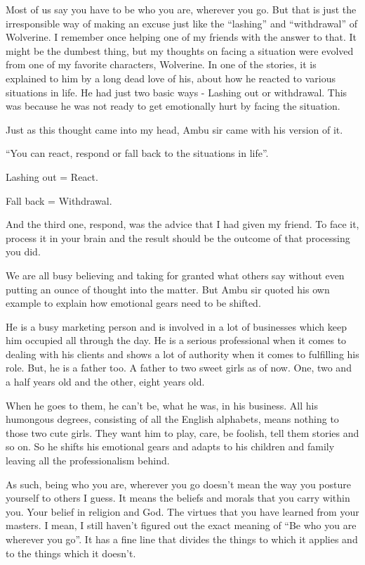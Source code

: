 \documentclass[twoside,11pt]{article}
\begin{document}
Most of us say you have to be who you are, wherever you go. But that is just the irresponsible way of making an excuse just like the ``lashing'' and ``withdrawal'' of Wolverine. I remember once helping one of my friends with the answer to that. It might be the dumbest thing, but my thoughts on facing a situation were evolved from one of my favorite characters, Wolverine. In one of the stories, it is explained to him by a long dead love of his, about how he reacted to various situations in life. He had just two basic ways - Lashing out or withdrawal. This was because he was not ready to get emotionally hurt by facing the situation.

Just as this thought came into my head, Ambu sir came with his version of it.

``You can react, respond or fall back to the situations in life''.

Lashing out = React.

Fall back = Withdrawal.

And the third one, respond, was the advice that I had given my friend. To face it, process it in your brain and the result should be the outcome of that processing you did.

We are all busy believing and taking for granted what others say without even putting an ounce of thought into the matter. But Ambu sir quoted his own example to explain how emotional gears need to be shifted.

He is a busy marketing person and is involved in a lot of businesses which keep him occupied all through the day. He is a serious professional when it comes to dealing with his clients and shows a lot of authority when it comes to fulfilling his role. But, he is a father too. A father to two sweet girls as of now. One, two and a half years old and the other, eight years old.

When he goes to them, he can't be, what he was, in his business. All his humongous degrees, consisting of all the English alphabets, means nothing to those two cute girls. They want him to play, care, be foolish, tell them stories and so on. So he shifts his emotional gears and adapts to his children and family leaving all the professionalism behind.

As such, being who you are, wherever you go doesn't mean the way you posture yourself to others I guess. It means the beliefs and morals that you carry within you. Your belief in religion and God. The virtues that you have learned from your masters. I mean, I still haven't figured out the exact meaning of ``Be who you are wherever you go''. It has a fine line that divides the things to which it applies and to the things which it doesn't.
\end{document}

